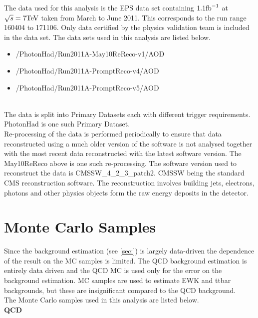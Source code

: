 The data used for this analysis is the EPS data set containing $1.1 \mbox{fb}^{-1}$
at $\sqrt{s} = 7 \mbox{TeV}$ taken from March to June 2011. This corresponds to the
run range 160404 to 171106. Only data certified by the physics validation team
is included in the data set. The data sets used in this analysis are listed 
below.

\begin{itemize}
\item /PhotonHad/Run2011A-May10ReReco-v1/AOD %
\item /PhotonHad/Run2011A-PromptReco-v4/AOD %
\item /PhotonHad/Run2011A-PromptReco-v5/AOD %
\end{itemize} \\

The data is split into Primary Datasets each with different trigger
requirements. PhotonHad is one such Primary Dataset. \\

Re-processing of the data is performed periodically to ensure that data
reconstructed using a much older version of the software is not analysed
together with the most recent data reconstructed with the latest software
version. The May10ReReco above is one such re-processing. The software version
used to reconstruct the data is CMSSW\_4\_2\_3\_patch2. CMSSW being the standard
CMS reconstruction software. The reconstruction involves building jets, 
electrons, photons and other physics objects form the raw energy deposits in the
detector.

\section{Monte Carlo Samples}

Since the background estimation (see \ref{sec:}) is largely data-driven the
dependence of the result on the MC samples is limited. The QCD background
estimation is entirely data driven and the QCD MC is used only for the error on
the background estimation. MC samples are used to estimate EWK and ttbar
backgrounds, but these are insignificant compared to the QCD background. \\

The Monte Carlo samples used in this analysis are listed below. \\

{\bf QCD}

